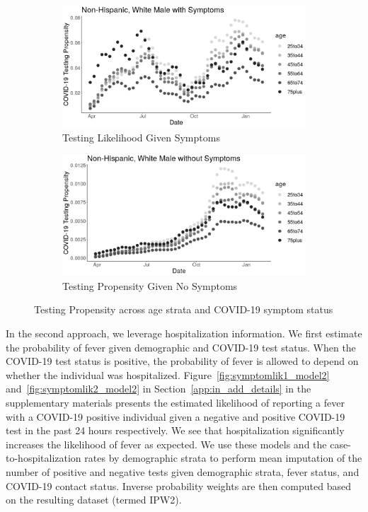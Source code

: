 \documentclass[11pt]{amsart}
\numberwithin{equation}{section}
\theoremstyle{plain}
\begin{document}
 \begin{figure}[!th]
 \centering
 \begin{subfigure}{.5\textwidth}
  \centering
  \includegraphics[width=.9\linewidth]{../figs/tvprop_alt_fig1_mainpaper.png}
  \caption{Testing Likelihood Given Symptoms}
  \label{fig:testinglik1_mainpaper}
 \end{subfigure}%
 \begin{subfigure}{.5\textwidth}
  \centering
 \includegraphics[width=.9\linewidth]{../figs/tvprop_alt_fig2_mainpaper.png}
  \caption{Testing Propensity Given No Symptoms}
  \label{fig:testinglik2_mainpaper}
 \end{subfigure}
 \caption{Testing Propensity across age strata and COVID-19 symptom status}
 \label{fig:testinglik_mainpaper}
 \end{figure}


 In the second approach, we leverage hospitalization information. We first estimate the probability of fever given demographic and COVID-19 test status.  When the COVID-19 test status is positive, the probability of fever is allowed to depend on whether the individual was hospitalized.  Figure~\ref{fig:symptomlik1_model2} and~\ref{fig:symptomlik2_model2} in Section~\ref{app:in_add_details} in the supplementary materials presents the estimated likelihood of reporting a fever with a COVID-19 positive individual given a negative and positive COVID-19 test in the past 24 hours respectively.  We see that hospitalization significantly increases the likelihood of fever as expected.  We use these models and the case-to-hospitalization rates by demographic strata to perform mean imputation of the number of positive and negative tests given demographic strata, fever status, and COVID-19 contact status. Inverse probability weights are then computed based on the resulting dataset (termed IPW2).
\end{document}
